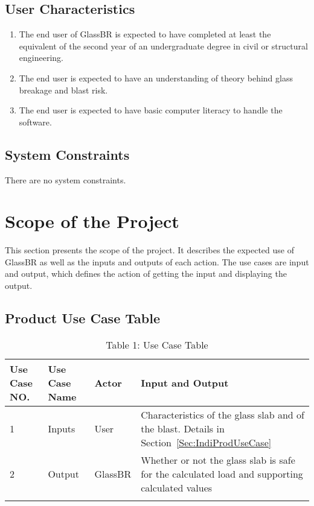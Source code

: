 \documentclass[12pt]{article}
\begin{document}
\subsection{User Characteristics}
\label{Sec:UserChar}
\begin{enumerate}
\item{The end user of GlassBR is expected to have completed at least the equivalent of the second year of an undergraduate degree in civil or structural engineering.}
\item{The end user is expected to have an understanding of theory behind glass breakage and blast risk.}
\item{The end user is expected to have basic computer literacy to handle the software.}
\end{enumerate}
\subsection{System Constraints}
\label{Sec:SystCons}
There are no system constraints.
\section{Scope of the Project}
\label{Sec:ScopoftheProj}
This section presents the scope of the project. It describes the expected use of GlassBR as well as the inputs and outputs of each action. The use cases are input and output, which defines the action of getting the input and displaying the output.
\subsection{Product Use Case Table}
\label{Sec:ProdUseCaseTabl}
\begin{longtable}{l l l l}
\toprule
Use Case NO. & Use Case Name & Actor & Input and Output
\\
\midrule
1 & Inputs & User & Characteristics of the glass slab and of the blast. Details in Section~\ref{Sec:IndiProdUseCase}
\\
2 & Output & GlassBR & Whether or not the glass slab is safe for the calculated load and supporting calculated values
\\
\bottomrule
\caption{Table 1: Use Case Table}
\label{Table:Tabl1:UseCaseTabl}
\end{longtable}
\end{document}
